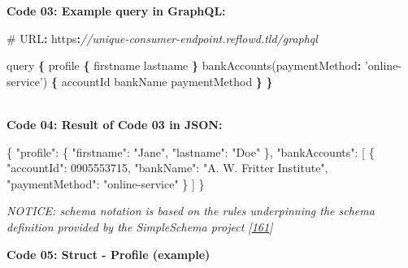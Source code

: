\documentclass[12pt,english,a4paper,titlepage,cleardoublepage=empty,dottedtoc]{report}
\newenvironment{Shaded}{\begin{snugshade}}{\end{snugshade}}
\newcommand{\DataTypeTok}[1]{\textcolor[rgb]{0.13,0.29,0.53}{#1}}
\newcommand{\DecValTok}[1]{\textcolor[rgb]{0.00,0.00,0.81}{#1}}
\newcommand{\StringTok}[1]{\textcolor[rgb]{0.31,0.60,0.02}{#1}}
\newcommand{\CommentTok}[1]{\textcolor[rgb]{0.56,0.35,0.01}{\textit{#1}}}
\newcommand{\OtherTok}[1]{\textcolor[rgb]{0.56,0.35,0.01}{#1}}
\newcommand{\FunctionTok}[1]{\textcolor[rgb]{0.00,0.00,0.00}{#1}}
\newcommand{\OperatorTok}[1]{\textcolor[rgb]{0.81,0.36,0.00}{\textbf{#1}}}
\newcommand{\AttributeTok}[1]{\textcolor[rgb]{0.77,0.63,0.00}{#1}}
\newcommand{\NormalTok}[1]{#1}
\begin{document}
\newpage

\textbf{\protect\hypertarget{code-03_graphql-query}{}{Code 03: Example
query in GraphQL}:}

\begin{Shaded}
\begin{Highlighting}[numbers=left,,]
\NormalTok{# URL}\OperatorTok{:}\NormalTok{ https}\OperatorTok{:}\CommentTok{//unique-consumer-endpoint.reflowd.tld/graphql}

\NormalTok{query }\OperatorTok{\{}
\NormalTok{    profile }\OperatorTok{\{}
\NormalTok{        firstname}
\NormalTok{        lastname}
    \OperatorTok{\}}
    \AttributeTok{bankAccounts}\NormalTok{(}\DataTypeTok{paymentMethod}\OperatorTok{:} \StringTok{'online-service'}\NormalTok{) }\OperatorTok{\{}
\NormalTok{        accountId}
\NormalTok{        bankName}
\NormalTok{        paymentMethod}
    \OperatorTok{\}}
\OperatorTok{\}}
\end{Highlighting}
\end{Shaded}

~\\
\textbf{\protect\hypertarget{code-04_graphql-query-result}{}{Code 04:
Result of Code 03 in JSON}:}

\begin{Shaded}
\begin{Highlighting}[numbers=left,,]
\FunctionTok{\{}
    \DataTypeTok{"profile"}\FunctionTok{:} \FunctionTok{\{}
        \DataTypeTok{"firstname"}\FunctionTok{:} \StringTok{"Jane"}\FunctionTok{,} 
        \DataTypeTok{"lastname"}\FunctionTok{:} \StringTok{"Doe"}
    \FunctionTok{\},}
    \DataTypeTok{"bankAccounts"}\FunctionTok{:} \OtherTok{[}
        \FunctionTok{\{}
            \DataTypeTok{"accountId"}\FunctionTok{:} \DecValTok{0905553715}\FunctionTok{,}
            \DataTypeTok{"bankName"}\FunctionTok{:} \StringTok{"A. W. Fritter Institute"}\FunctionTok{,}
            \DataTypeTok{"paymentMethod"}\FunctionTok{:} \StringTok{"online-service"}
        \FunctionTok{\}}
    \OtherTok{]}
\FunctionTok{\}}
\end{Highlighting}
\end{Shaded}

\newpage

\emph{NOTICE: schema notation is based on the rules underpinning the
schema definition provided by the SimpleSchema project
{[}\protect\hyperlink{ref-web_2017_repo_node-simple-schema}{161}{]}}

\textbf{\protect\hypertarget{code-05_struct_profile}{}{Code 05: Struct -
Profile (example)}}
\end{document}
